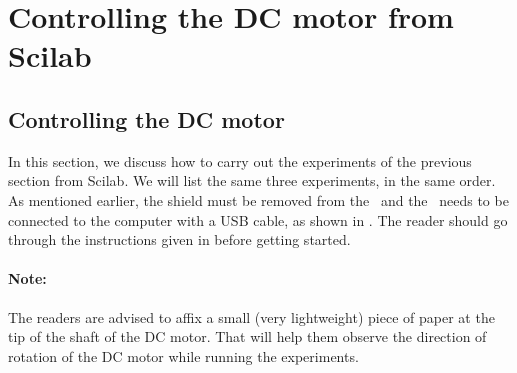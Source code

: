\section{Controlling the DC motor from Scilab}
\label{sec:dcm-sci}
\subsection{Controlling the DC motor}
In this section, we discuss how to carry out the experiments of the
previous section from Scilab. We will list the same three experiments,
in the same order.  As mentioned earlier, the shield must be removed from 
the \arduino\ and the \arduino\ needs to be connected to the computer 
with a USB cable, as shown in . The reader should go through the instructions given in
 before getting started. 

\paragraph{Note:} The readers are advised to affix a small 
(very lightweight) piece of paper at the tip of the shaft of the DC motor. 
That will help them observe the direction of rotation 
of the DC motor while running the experiments. 

